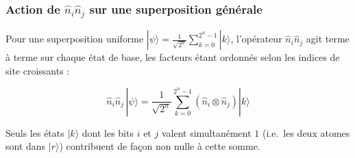 \documentclass{ceri/sty/rapport}
\begin{document}
\subsubsection*{Action de $\hat{n}_i\hat{n}_j$ sur une superposition générale}

Pour une superposition uniforme $|\psi\rangle = \frac{1}{\sqrt{2^n}}\sum_{k=0}^{2^n-1}|k\rangle$,
l'opérateur $\hat{n}_i\hat{n}_j$ agit terme à terme sur chaque état de base, les facteurs étant
ordonnés selon les indices de site croissants :

\begin{equation}
\hat{n}_i \hat{n}_j\,|\psi\rangle
= \frac{1}{\sqrt{2^n}}\sum_{k=0}^{2^n-1} \left(\hat{n}_i \otimes \hat{n}_j\right)|k\rangle
\end{equation}

Seuls les états $|k\rangle$ dont les bits $i$ et $j$ valent simultanément $1$ (i.e.\ les deux
atomes sont dans $|r\rangle$) contribuent de façon non nulle à cette somme.


\end{document}
